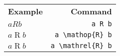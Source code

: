 \documentclass[varwidth,crop]{standalone}
\begin{document}
\begin{tabular}{lr}
    \textbf{Example} & \textbf{Command}\\
    $a R b$ & \verb|a R b|\\
    $a \mathop{R} b$ & \verb|a \mathop{R} b|\\
    $a \mathrel{R} b$ & \verb|a \mathrel{R} b|\\
\end{tabular}
\end{document}
